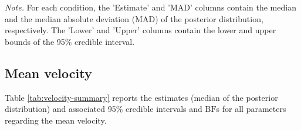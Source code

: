 \documentclass[
  11pt,
  english,
  ,doc,floatsintext]{apa6}
\begin{document}
\begin{table}[htb]
\begin{center}
\begin{threeparttable}
{}

\begin{tablenotes}[para]
\normalsize{\textit{Note.} For each condition, the 'Estimate' and 'MAD' columns contain the
    median and the median absolute deviation (MAD) of the posterior distribution,
    respectively. The 'Lower' and 'Upper' columns contain the lower and upper
    bounds of the 95\% credible interval.}
\end{tablenotes}

\end{threeparttable}
\end{center}

\end{table}

\hypertarget{mean-velocity}{%
\subsection{Mean velocity}\label{mean-velocity}}

Table \ref{tab:velocity-summary} reports the estimates (median of the posterior distribution) and associated 95\% credible intervals and \(\text{BF}\)s for all parameters regarding the mean velocity.
\end{document}
